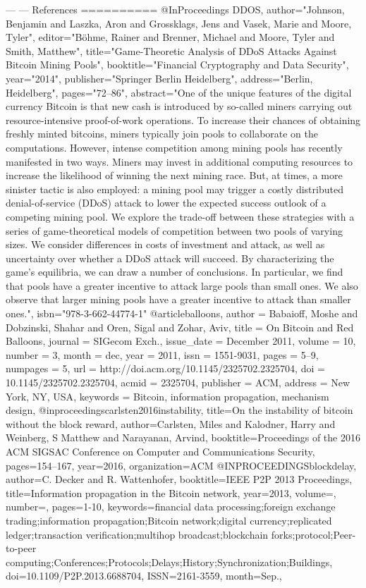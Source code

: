 ---
---
References
==========
@InProceedings{
DDOS,
author="Johnson, Benjamin
and Laszka, Aron
and Grossklags, Jens
and Vasek, Marie
and Moore, Tyler",
editor="B{\"o}hme, Rainer
and Brenner, Michael
and Moore, Tyler
and Smith, Matthew",
title="Game-Theoretic Analysis of DDoS Attacks Against Bitcoin Mining Pools",
booktitle="Financial Cryptography and Data Security",
year="2014",
publisher="Springer Berlin Heidelberg",
address="Berlin, Heidelberg",
pages="72--86",
abstract="One of the unique features of the digital currency Bitcoin is that new cash is introduced by so-called miners carrying out resource-intensive proof-of-work operations. To increase their chances of obtaining freshly minted bitcoins, miners typically join pools to collaborate on the computations. However, intense competition among mining pools has recently manifested in two ways. Miners may invest in additional computing resources to increase the likelihood of winning the next mining race. But, at times, a more sinister tactic is also employed: a mining pool may trigger a costly distributed denial-of-service (DDoS) attack to lower the expected success outlook of a competing mining pool. We explore the trade-off between these strategies with a series of game-theoretical models of competition between two pools of varying sizes. We consider differences in costs of investment and attack, as well as uncertainty over whether a DDoS attack will succeed. By characterizing the game's equilibria, we can draw a number of conclusions. In particular, we find that pools have a greater incentive to attack large pools than small ones. We also observe that larger mining pools have a greater incentive to attack than smaller ones.",
isbn="978-3-662-44774-1"
}
@article{balloons,
 author = {Babaioff, Moshe and Dobzinski, Shahar and Oren, Sigal and Zohar, Aviv},
 title = {On Bitcoin and Red Balloons},
 journal = {SIGecom Exch.},
 issue_date = {December 2011},
 volume = {10},
 number = {3},
 month = dec,
 year = {2011},
 issn = {1551-9031},
 pages = {5--9},
 numpages = {5},
 url = {http://doi.acm.org/10.1145/2325702.2325704},
 doi = {10.1145/2325702.2325704},
 acmid = {2325704},
 publisher = {ACM},
 address = {New York, NY, USA},
 keywords = {Bitcoin, information propagation, mechanism design},
} 
@inproceedings{carlsten2016instability,
  title={On the instability of bitcoin without the block reward},
  author={Carlsten, Miles and Kalodner, Harry and Weinberg, S Matthew and Narayanan, Arvind},
  booktitle={Proceedings of the 2016 ACM SIGSAC Conference on Computer and Communications Security},
  pages={154--167},
  year={2016},
  organization={ACM}
}
@INPROCEEDINGS{blockdelay, 
author={C. {Decker} and R. {Wattenhofer}}, 
booktitle={IEEE P2P 2013 Proceedings}, 
title={Information propagation in the Bitcoin network}, 
year={2013}, 
volume={}, 
number={}, 
pages={1-10}, 
keywords={financial data processing;foreign exchange trading;information propagation;Bitcoin network;digital currency;replicated ledger;transaction verification;multihop broadcast;blockchain forks;protocol;Peer-to-peer computing;Conferences;Protocols;Delays;History;Synchronization;Buildings}, 
doi={10.1109/P2P.2013.6688704}, 
ISSN={2161-3559}, 
month={Sep.},}

